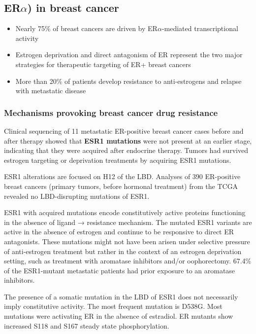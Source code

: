 \subsection{ER$\alpha$) in breast cancer}

\begin{itemize}
\tightlist
\item
  Nearly 75\% of breast cancers are driven by ER$\alpha$-mediated transcriptional activity
\item
  Estrogen deprivation and direct antagonism of ER represent the two major strategies for therapeutic targeting of ER+ breast cancers
\item
  More than 20\% of patients develop resistance to anti-estrogens and relapse with metastatic disease
\end{itemize}

\hypertarget{mechanisms-provoking-breast-cancer-drug-resistance}{%
\subsubsection{Mechanisms provoking breast cancer drug resistance}\label{mechanisms-provoking-breast-cancer-drug-resistance}}

Clinical sequencing of 11 metastatic ER-positive breast cancer cases before and after therapy showed that \textbf{ESR1 mutations} were not present at an earlier stage, indicating that they were acquired after endocrine therapy. Tumors had survived estrogen targeting or deprivation treatments by acquiring ESR1 mutations.

ESR1 alterations are focused on H12 of the LBD. Analyses of 390 ER-positive breast cancers (primary tumors, before hormonal treatment) from the TCGA revealed no LBD-disrupting mutations of ESR1.

ESR1 with acquired mutations encode constitutively active proteins functioning in the absence of ligand → resistance mechanism. The mutated ESR1 variants are active in the absence of estrogen and continue to be responsive to direct ER antagonists. These mutations might not have been arisen under selective pressure of anti-estrogen treatment but rather in the context of an estrogen deprivation setting, such as treatment with aromatase inhibitors and/or oophorectomy. 67.4\% of the ESR1-mutant metastatic patients had prior exposure to an aromatase inhibitors.

The presence of a somatic mutation in the LBD of ESR1 does not necessarily imply constitutive activity. The most frequent mutation is D538G. Most mutations were activating ER in the absence of estradiol. ER mutants show increased S118 and S167 steady state phosphorylation.

